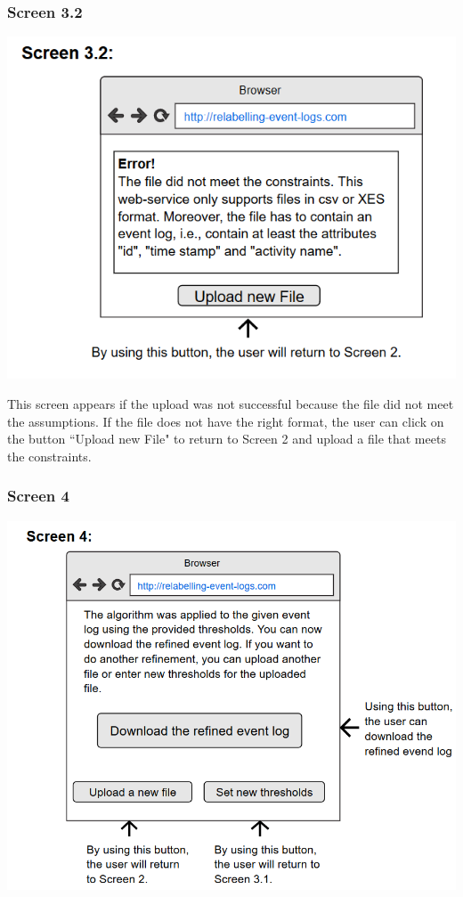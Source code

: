 \documentclass[notitlepage]{article}
\begin{document}
\begin{flushleft}
\subsubsection{Screen 3.2}
\includegraphics[scale=0.9]{InterfaceMockup3-2.png}

This screen appears if the upload was not successful because the file did not meet the assumptions. If the file does not have the right format, the user can click on the button ``Upload new File" to return to Screen 2 and upload a file that meets the constraints.


\subsubsection{Screen 4}
\includegraphics[scale=0.8]{InterfaceMockup4.png}


\end{flushleft}
\end{document}

